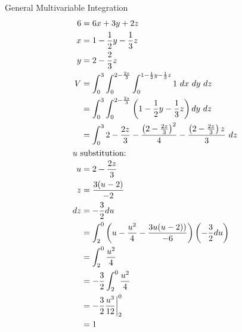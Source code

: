 \documentclass[8pt]{extarticle}
\begin{document}
\begin{problem}{General Multivariable Integration}
\begin{align*}
      6 &= 6x + 3y + 2z\\
      x &= 1 - \frac{1}{2}y - \frac{1}{3}z\\
      y &=2- \frac{2}{3}z\\
      V &= \int_{0}^{3}\int_{0}^{2-\frac{2z}{3}}\int_{0}^{1-\frac{1}{2}y - \frac{1}{3}z}1~dx~dy~dz\\
        &= \int_{0}^{3}\int_{0}^{2-\frac{2z}{3}}\left(1-\frac{1}{2}y-\frac{1}{3}z\right) dy~dz\\
        &= \int_{0}^{3}2-\frac{2z}{3}-\frac{\left(2-\frac{2z}{3}\right)^2}{4}-\frac{\left(2-\frac{2z}{3}\right)z}{3}~dz\\
        \shortintertext{$u$ substitution:}
      u &= 2-\frac{2z}{3}\\
      z &= \frac{3(u-2)}{-2}\\
      dz &= -\frac{3}{2}du\\
         &= \int_{2}^{0} \left(u - \frac{u^2}{4} - \frac{3u(u-2))}{-6} \right)\left(-\frac{3}{2}du\right)\\
         &= \int_{2}^{0} \frac{u^2}{4}\\
         &= -\frac{3}{2}\int_{2}^{0}\frac{u^2}{4}\\
         &= -\frac{3}{2}\frac{u^3}{12}\biggr\vert_{2}^{0}\\
         &= 1
    \end{align*}
  \end{problem}
\end{document}
